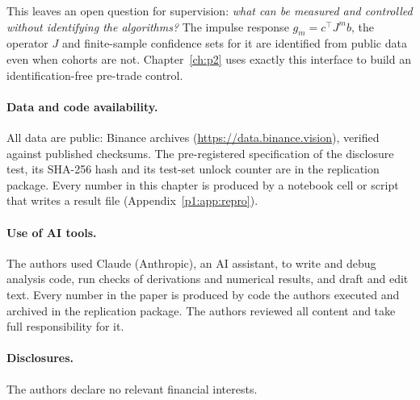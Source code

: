 This leaves an open question for supervision: \emph{what can be measured and controlled without identifying the algorithms?} The impulse response $g_m=c^\top J^mb$, the operator $J$ and finite-sample confidence sets for it are identified from public data even when cohorts are not. Chapter~\ref{ch:p2} uses exactly this interface to build an identification-free pre-trade control.

\paragraph{Data and code availability.} All data are public: Binance archives (\url{https://data.binance.vision}), verified against published checksums. The pre-registered specification of the disclosure test, its SHA-256 hash and its test-set unlock counter are in the replication package. Every number in this chapter is produced by a notebook cell or script that writes a result file (Appendix~\ref{p1:app:repro}).

\paragraph{Use of AI tools.} The authors used Claude (Anthropic), an AI assistant, to write and debug analysis code, run checks of derivations and numerical results, and draft and edit text. Every number in the paper is produced by code the authors executed and archived in the replication package. The authors reviewed all content and take full responsibility for it.

\paragraph{Disclosures.} The authors declare no relevant financial interests.

